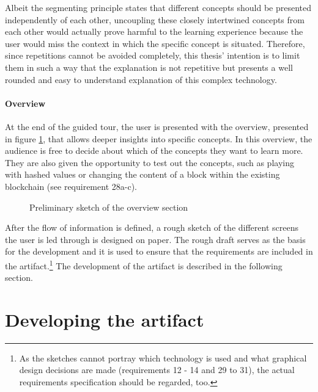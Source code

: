 Albeit the segmenting principle states that different concepts should be presented independently of each other, uncoupling these closely intertwined concepts from each other would actually prove harmful to the learning experience because the user would miss the context in which the specific concept is situated. Therefore, since repetitions cannot be avoided completely, this thesis' intention is to limit them in such a way that the explanation is not repetitive but presents a well rounded and easy to understand explanation of this complex technology.

\paragraph{Overview} At the end of the guided tour, the user is presented with the overview, presented in figure \ref{fig:OverviewPic}, that allows deeper insights into specific concepts.
In this overview, the audience is free to decide about which of the concepts they want to learn more. They are also given the opportunity to test out the concepts, such as playing with hashed values or changing the content of a block within the existing blockchain (see requirement 28a-c).

\begin{figure}
    \centering
    
    \caption{Preliminary sketch of the overview section}
    \label{fig:OverviewPic}
\end{figure}

After the flow of information is defined, a rough sketch of the different screens the user is led through is designed on paper. The rough draft serves as the basis for the development and it is used to ensure that the requirements are included in the artifact.\footnote{ As the sketches cannot portray which technology is used and what graphical design decisions are made (requirements 12 - 14 and 29 to 31), the actual requirements specification should be regarded, too.} The development of the artifact is described in the following section.

\section{Developing the artifact}

